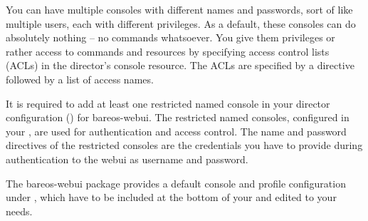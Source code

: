You can have multiple consoles with different names and passwords, sort of like multiple users, each with different privileges. As a default, these consoles can do absolutely nothing – no commands whatsoever. You give them privileges or rather access to commands and resources by specifying access control lists (ACLs) in the director’s console resource. The ACLs are specified by a directive followed by a list of access names.

It is required to add at least one restricted named console in your director configuration () for bareos-webui. The restricted named consoles, configured in your , are used for authentication and access control. The name and password directives of the restricted consoles are the credentials you have to provide during authentication to the webui as username and password.

% 

The bareos-webui package provides a default console and profile configuration under ,
which have to be included at the bottom of your  and edited to your needs.

